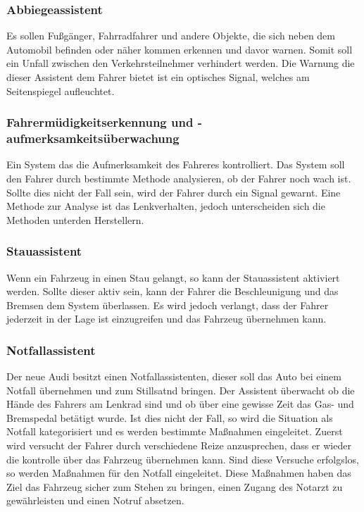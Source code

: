         \subsubsection{Abbiegeassistent}
        Es sollen Fußgänger, Fahrradfahrer und andere Objekte, die sich neben dem Automobil befinden
        oder näher kommen erkennen und davor warnen. Somit soll ein Unfall zwischen den Verkehrsteilnehmer
        verhindert werden. Die Warnung die dieser Assistent dem Fahrer bietet ist ein optisches Signal,
        welches am Seitenspiegel aufleuchtet. 

        \subsubsection{Fahrermüdigkeitserkennung und -aufmerksamkeitsüberwachung}
        Ein System das die Aufmerksamkeit des Fahreres kontrolliert. Das System soll den Fahrer durch
        bestimmte Methode analysieren, ob der Fahrer noch wach ist. Sollte dies nicht der Fall sein,
        wird der Fahrer durch ein Signal gewarnt. Eine Methode zur Analyse ist das Lenkverhalten, jedoch
        unterscheiden sich die Methoden unterden Herstellern.
        
        \subsubsection{Stauassistent}
        Wenn ein Fahrzeug in einen Stau gelangt, so kann der Stauassistent aktiviert werden. Sollte dieser
        aktiv sein, kann der Fahrer die Beschleunigung und das Bremsen dem System überlassen. Es wird
        jedoch verlangt, dass der Fahrer jederzeit in der Lage ist einzugreifen und das Fahrzeug übernehmen
        kann.
        
        \subsubsection{Notfallassistent}
        Der neue Audi besitzt einen Notfallassistenten, dieser soll das Auto bei einem Notfall übernehmen 
        und zum Stillsatnd bringen. Der Assistent überwacht ob die Hände des Fahrers am Lenkrad sind und 
        ob über eine gewisse Zeit das Gas- und Bremspedal betätigt wurde. Ist dies nicht der Fall, so 
        wird die Situation als Notfall kategorisiert und es werden bestimmte Maßnahmen eingeleitet.
        Zuerst wird versucht der Fahrer durch verschiedene Reize anzusprechen, dass er wieder die kontrolle 
        über das Fahrzeug übernehmen kann. Sind diese Versuche erfolgslos, so werden Maßnahmen für den 
        Notfall eingeleitet. Diese Maßnahmen haben das Ziel das Fahrzeug sicher zum Stehen zu bringen, einen Zugang des 
        Notarzt zu gewährleisten und einen Notruf absetzen.
        

